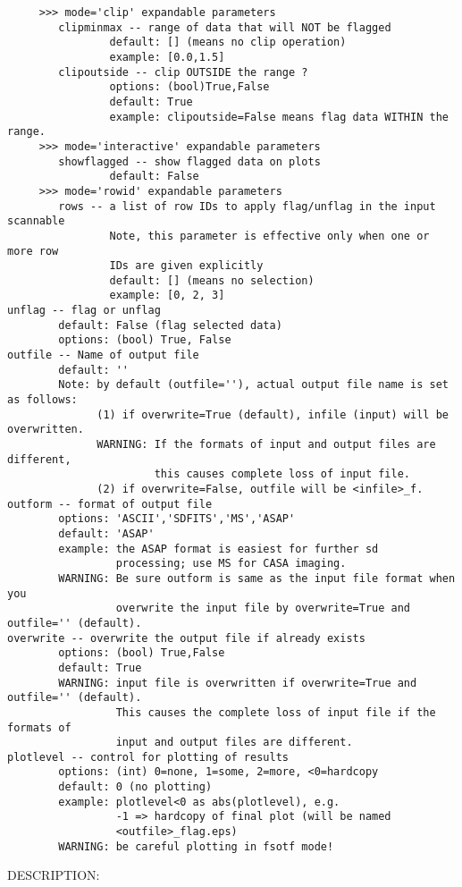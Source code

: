 \begin{verbatim}
     >>> mode='clip' expandable parameters
        clipminmax -- range of data that will NOT be flagged
                default: [] (means no clip operation)
                example: [0.0,1.5]
        clipoutside -- clip OUTSIDE the range ?
                options: (bool)True,False
                default: True
                example: clipoutside=False means flag data WITHIN the range.
     >>> mode='interactive' expandable parameters
        showflagged -- show flagged data on plots
                default: False
     >>> mode='rowid' expandable parameters
        rows -- a list of row IDs to apply flag/unflag in the input scannable
                Note, this parameter is effective only when one or more row 
                IDs are given explicitly
                default: [] (means no selection)
                example: [0, 2, 3]
unflag -- flag or unflag
        default: False (flag selected data)
        options: (bool) True, False
outfile -- Name of output file
        default: ''
        Note: by default (outfile=''), actual output file name is set as follows: 
              (1) if overwrite=True (default), infile (input) will be overwritten.
              WARNING: If the formats of input and output files are different, 
                       this causes complete loss of input file.
              (2) if overwrite=False, outfile will be <infile>_f. 
outform -- format of output file
        options: 'ASCII','SDFITS','MS','ASAP'
        default: 'ASAP'
        example: the ASAP format is easiest for further sd
                 processing; use MS for CASA imaging.
        WARNING: Be sure outform is same as the input file format when you 
                 overwrite the input file by overwrite=True and outfile='' (default).
overwrite -- overwrite the output file if already exists
        options: (bool) True,False
        default: True
        WARNING: input file is overwritten if overwrite=True and outfile='' (default). 
                 This causes the complete loss of input file if the formats of
                 input and output files are different.
plotlevel -- control for plotting of results
        options: (int) 0=none, 1=some, 2=more, <0=hardcopy
        default: 0 (no plotting)
        example: plotlevel<0 as abs(plotlevel), e.g.
                 -1 => hardcopy of final plot (will be named
                 <outfile>_flag.eps)
        WARNING: be careful plotting in fsotf mode!

\end{verbatim}


DESCRIPTION:

